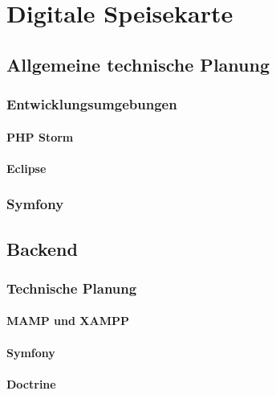 \chapter{Digitale Speisekarte}
\renewcommand{\kapitelautor}{Autor: Katharina Joksch}

\section{Allgemeine technische Planung}

  \subsection{Entwicklungsumgebungen}

    \subsubsection{PHP Storm}

    \subsubsection{Eclipse}

  \subsection{Symfony}

\section{Backend}

  \subsection{Technische Planung}

    \subsubsection{MAMP und XAMPP}

    \subsubsection{Symfony}

    \subsubsection{Doctrine}

